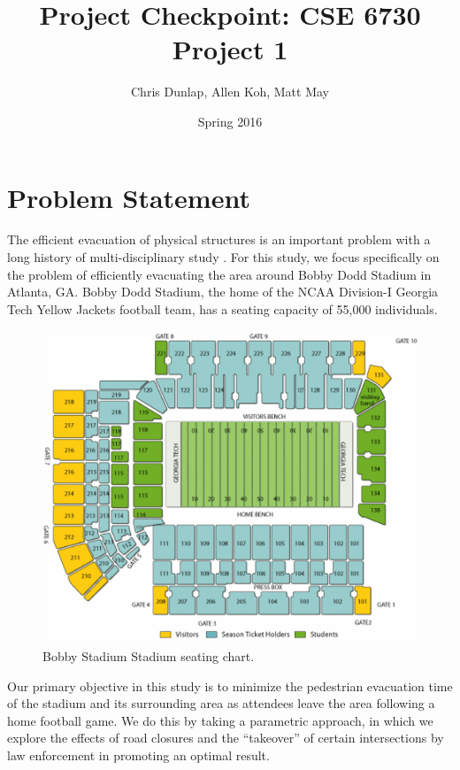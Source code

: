 \documentclass[12pt]{article}
\title{Project Checkpoint: CSE 6730 Project 1}
\author{Chris Dunlap, Allen Koh, Matt May}
\date{Spring 2016}
\begin{document}
\begin{titlepage}
  \maketitle
  \thispagestyle{empty}
\end{titlepage}

\newpage
  \tableofcontents
  \thispagestyle{empty}
\newpage

\section{Problem Statement}
\label{sec:problem}

The efficient evacuation of physical structures is an important problem with a
long history of multi-disciplinary study \cite{zheng2009modeling}. For this
study, we focus specifically on the problem of efficiently evacuating the
area around Bobby Dodd Stadium in Atlanta, GA. Bobby Dodd Stadium, the home of
the NCAA Division-I Georgia Tech Yellow Jackets football team, has a
seating capacity of 55,000 individuals.

\begin{figure}[H]
  \includegraphics[width=\linewidth,natwidth=521,natheight=435]{stadium_diagram_updated.png}
  \caption{Bobby Stadium Stadium seating chart.}
  \label{fig:stadiumseating}
\end{figure}

Our primary objective in this study is to minimize the pedestrian evacuation
time of the stadium and its surrounding area as attendees leave the area
following a home football game. We do this by taking a parametric approach, in
which we explore the effects of road closures and the ``takeover'' of certain
intersections by law enforcement in promoting an optimal result.
\end{document}
